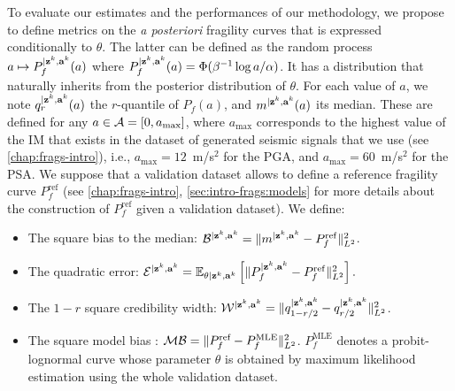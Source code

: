 To evaluate our estimates and the performances of our methodology, we propose to define metrics on the \emph{a posteriori} fragility curves that is expressed conditionally to $\theta$.
The latter can be defined as the
random process $a\mapsto P_f^{|\mathbf{z}^k,\mathbf{a}^k}(a)$ where  $P_f^{|\mathbf{z}^k,\mathbf{a}^k}(a)=\Phi(\beta^{-1}\log a/\alpha)$\vspace*{-4pt}. It has a distribution that naturally inherits from the posterior distribution of $\theta$.
For each value of $a$, we note $q_r^{|\mathbf{z}^k,\mathbf{a}^k}(a)$ the $r$-quantile of $P_f(a)$, and $m^{|\mathbf{z}^k,\mathbf{a}^k}(a)$ its median.
These are defined for any $a\in\mathcal{A}=[0,a_{\text{max}}]$, where $a_{\text{max}}$ corresponds to the highest value of the IM that exists in the dataset of generated seismic signals that we use (see \cref{chap:frags-intro}), i.e.,
$a_{\text{max}}=12$~m/s$^2$ for the PGA, and  $a_{\text{max}}=60$~m/s$^2$ for the PSA.
We suppose that a validation dataset allows to define a reference fragility curve $P_f^{\text{ref}}$ (see \cref{chap:frags-intro}, \cref{sec:intro-frags:models} for more details about the construction of $P_f^{\text{ref}}$ given a validation dataset). We define:
\begin{itemize}
    \item The square bias to the median: $\mathcal{B}^{|\mathbf{z}^k,\mathbf{a}^k} = \|m^{|\mathbf{z}^k,\mathbf{a}^k}- P_f^{\mathrm{ref}}\|^2_{L^2}$. %
    \item The quadratic error: $\mathcal{E}^{|\mathbf{z}^k,\mathbf{a}^k}=\mathbb{E}_{\theta|\mathbf{z}^k,\mathbf{a}^k}\left[\|P_f^{|\mathbf{z}^k,\mathbf{a}^k}-P_f^{\mathrm{ref}} \|^2_{L^2}\right].$
    \item The $1-r$ square credibility width: $\mathcal{W}^{|\mathbf{z}^k,\mathbf{a}^k}= \|q_{1-{r/2}}^{|\mathbf{z}^k,\mathbf{a}^k} - q_{{r/2}}^{|\mathbf{z}^k,\mathbf{a}^k}\|_{L^2}^2$.
    \item {The square model bias :  $\mathcal{M}\mathcal{B} = \|P_f^{\text{ref}}-P_f^{\text{MLE}}\|_{L^2}^2$. $P_f^{\text{MLE}}$ denotes a probit-lognormal curve whose parameter $\theta$ is obtained by maximum likelihood estimation using the whole validation dataset.}
\end{itemize}

